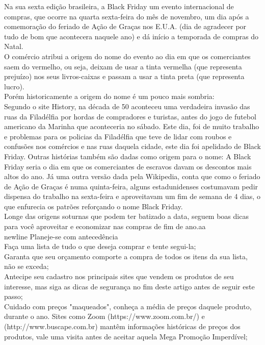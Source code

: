 \documentclass[]{article}
\begin{document}
Na sua sexta edição brasileira, a Black Friday um evento internacional de compras, que ocorre na quarta sexta-feira do mês de novembro, um dia após a comemoração do feriado de Ação de Graças nos E.U.A. (dia de agradecer por tudo de bom que acontecera naquele ano) e dá início a temporada de compras do Natal.\\
\newline
O comércio atribui a origem do nome do evento ao dia em que os comerciantes saem do vermelho, ou seja, deixam de usar a tinta vermelha (que representa prejuízo) nos seus livros-caixas e passam a usar a tinta preta (que representa lucro).\\
\newline
Porém historicamente a origem do nome é um pouco mais sombria:\\
\newline
Segundo o site History, na década de 50 aconteceu uma verdadeira invasão das ruas da Filadélfia por hordas de compradores e turistas, antes do jogo de futebol americano da Marinha que aconteceria no sábado. Este dia, foi de muito trabalho e problemas para os policias da Filadélfia que teve de lidar com roubos e confusões nos comércios e nas ruas daquela cidade, este dia foi apelidado de Black Friday. Outras histórias também são dadas como origem para o nome: A Black Friday seria o dia em que os comerciantes de escravos davam os descontos mais altos do ano. Já uma outra versão dada pela Wikipedia, conta que como o feriado de Ação de Graças é numa quinta-feira, alguns estadunidenses costumavam pedir dispensa do trabalho na sexta-feira e aproveitavam um fim de semana de 4 dias, o que enfurecia os patrões reforçando o nome Black Friday.\\
\newline
Longe das origens soturnas que podem ter batizado a data, seguem boas dicas para você aproveitar e economizar nas compras de fim de ano.aa
\\newline
Planeje-se com antecedência\\
\newline
Faça uma lista de tudo o que deseja comprar e tente segui-la;\\
Garanta que seu orçamento comporte a compra de todos os itens da sua lista, não se exceda;\\
Antecipe seu cadastro nos principais sites que vendem os produtos de seu interesse, mas siga as dicas de segurança no fim deste artigo antes de seguir este passo;\\
Cuidado com preços "maqueados", conheça a média de preços daquele produto, durante o ano. Sites como Zoom (https://www.zoom.com.br/) e (http://www.buscape.com.br) mantêm informações históricas de preços dos produtos, vale uma visita antes de aceitar aquela Mega Promoção Imperdível;\\
\end{document}
